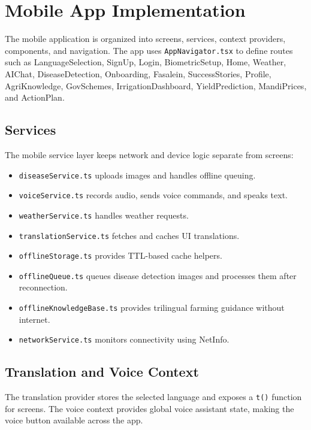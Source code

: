 \documentclass[12pt,a4paper]{report}
\begin{document}
\section{Mobile App Implementation}

The mobile application is organized into screens, services, context providers, components, and navigation. The app uses \texttt{AppNavigator.tsx} to define routes such as LanguageSelection, SignUp, Login, BiometricSetup, Home, Weather, AIChat, DiseaseDetection, Onboarding, Fasalein, SuccessStories, Profile, AgriKnowledge, GovSchemes, IrrigationDashboard, YieldPrediction, MandiPrices, and ActionPlan.

\subsection{Services}

The mobile service layer keeps network and device logic separate from screens:

\begin{itemize}[leftmargin=1.5em]
  \item \texttt{diseaseService.ts} uploads images and handles offline queuing.
  \item \texttt{voiceService.ts} records audio, sends voice commands, and speaks text.
  \item \texttt{weatherService.ts} handles weather requests.
  \item \texttt{translationService.ts} fetches and caches UI translations.
  \item \texttt{offlineStorage.ts} provides TTL-based cache helpers.
  \item \texttt{offlineQueue.ts} queues disease detection images and processes them after reconnection.
  \item \texttt{offlineKnowledgeBase.ts} provides trilingual farming guidance without internet.
  \item \texttt{networkService.ts} monitors connectivity using NetInfo.
\end{itemize}

\subsection{Translation and Voice Context}

The translation provider stores the selected language and exposes a \texttt{t()} function for screens. The voice context provides global voice assistant state, making the voice button available across the app.
\end{document}
